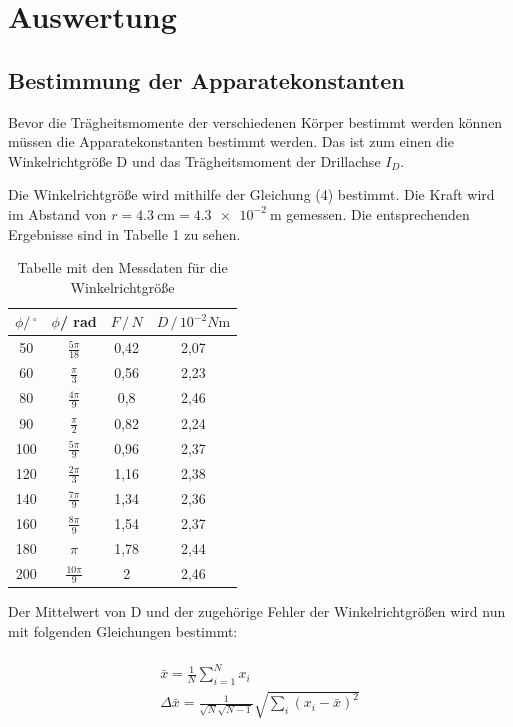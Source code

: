 \section{Auswertung}
\subsection{Bestimmung der Apparatekonstanten}

Bevor die Trägheitsmomente der verschiedenen Körper bestimmt werden können müssen die
Apparatekonstanten bestimmt werden. Das ist zum einen die Winkelrichtgröße D und
das Trägheitsmoment der Drillachse $I_D$.

Die Winkelrichtgröße wird mithilfe der Gleichung (4) bestimmt. Die Kraft wird im Abstand
von $r = \SI{4.3}{\centi\meter} = \SI{4.3e-2}{\meter}$ gemessen.
Die entsprechenden Ergebnisse sind in Tabelle 1 zu sehen.

\begin{table}[H]
  \centering
  \caption{Tabelle mit den Messdaten für die Winkelrichtgröße}
  \begin{tabular}{c c c c}
    \toprule
    $\phi / \, ^\circ $ & $\phi$/ rad & $F \, / \, N$ &
    $D \, / \, 10^{-2} N \si{\meter}$ \\
    \midrule
    50 &  $\frac{5\pi}{18}$ & 0,42 & 2,07 \\
    60 &  $\frac{\pi}{3}$ & 0,56 & 2,23 \\
    80 &  $\frac{4\pi}{9}$ & 0,8 & 2,46 \\
    90 &  $\frac{\pi}{2} $ & 0,82 & 2,24 \\
    100 & $\frac{5\pi}{9}$ & 0,96 & 2,37 \\
    120 & $\frac{2\pi}{3}$ & 1,16 & 2,38 \\
    140 & $\frac{7\pi}{9}$ & 1,34 & 2,36 \\
    160 & $\frac{8\pi}{9}$ & 1,54 & 2,37 \\
    180 & $\pi           $ & 1,78 & 2,44 \\
    200 & $\frac{10\pi}{9}$ &   2 & 2,46 \\
    \bottomrule
  \end{tabular}
\end{table}

Der Mittelwert von D und der zugehörige Fehler der Winkelrichtgrößen wird nun mit
folgenden Gleichungen bestimmt:\\\\

\begin{gather}
  \bar{x} = \frac{1}{N} \sum_{i=1}^{N} x_i \\
  \Delta \bar{x} = \frac{1}{\sqrt{N}\sqrt{N-1}} \sqrt{\sum_{i}(x_i-\bar{x})^2}
\end{gather}

